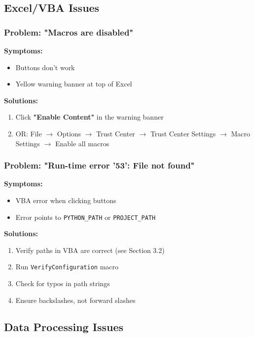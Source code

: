 \documentclass[11pt,a4paper]{article}
\begin{document}
\subsection{Excel/VBA Issues}

\subsubsection{Problem: "Macros are disabled"}

\textbf{Symptoms:}
\begin{itemize}[leftmargin=*]
    \item Buttons don't work
    \item Yellow warning banner at top of Excel
\end{itemize}

\textbf{Solutions:}
\begin{enumerate}[leftmargin=*]
    \item Click \textbf{"Enable Content"} in the warning banner
    \item OR: File $\rightarrow$ Options $\rightarrow$ Trust Center $\rightarrow$ Trust Center Settings $\rightarrow$ Macro Settings $\rightarrow$ Enable all macros
\end{enumerate}

\subsubsection{Problem: "Run-time error '53': File not found"}

\textbf{Symptoms:}
\begin{itemize}[leftmargin=*]
    \item VBA error when clicking buttons
    \item Error points to \texttt{PYTHON\_PATH} or \texttt{PROJECT\_PATH}
\end{itemize}

\textbf{Solutions:}
\begin{enumerate}[leftmargin=*]
    \item Verify paths in VBA are correct (see Section 3.2)
    \item Run \texttt{VerifyConfiguration} macro
    \item Check for typos in path strings
    \item Ensure backslashes, not forward slashes
\end{enumerate}

\subsection{Data Processing Issues}
\end{document}
